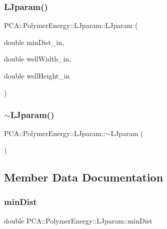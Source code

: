 \subsubsection{\texorpdfstring{L\+Jparam()}{LJparam()}}
{\footnotesize\ttfamily P\+C\+A\+::\+Polymer\+Energy\+::\+L\+Jparam\+::\+L\+Jparam (\begin{DoxyParamCaption}\item[{double}]{min\+Dist\+\_\+in,  }\item[{double}]{well\+Width\+\_\+in,  }\item[{double}]{well\+Height\+\_\+in }\end{DoxyParamCaption})}

\hypertarget{class_p_c_a_1_1_polymer_energy_1_1_l_jparam_ad4eded4802535449a325849e19554169}{}\label{class_p_c_a_1_1_polymer_energy_1_1_l_jparam_ad4eded4802535449a325849e19554169} 
\subsubsection{\texorpdfstring{$\sim$\+L\+Jparam()}{~LJparam()}}
{\footnotesize\ttfamily P\+C\+A\+::\+Polymer\+Energy\+::\+L\+Jparam\+::$\sim$\+L\+Jparam (\begin{DoxyParamCaption}{ }\end{DoxyParamCaption})}



\subsection{Member Data Documentation}
\hypertarget{class_p_c_a_1_1_polymer_energy_1_1_l_jparam_a9b9843259c0f7ec19d622dd4ee27c5a9}{}\label{class_p_c_a_1_1_polymer_energy_1_1_l_jparam_a9b9843259c0f7ec19d622dd4ee27c5a9} 
\subsubsection{\texorpdfstring{min\+Dist}{minDist}}
{\footnotesize\ttfamily double P\+C\+A\+::\+Polymer\+Energy\+::\+L\+Jparam\+::min\+Dist}


